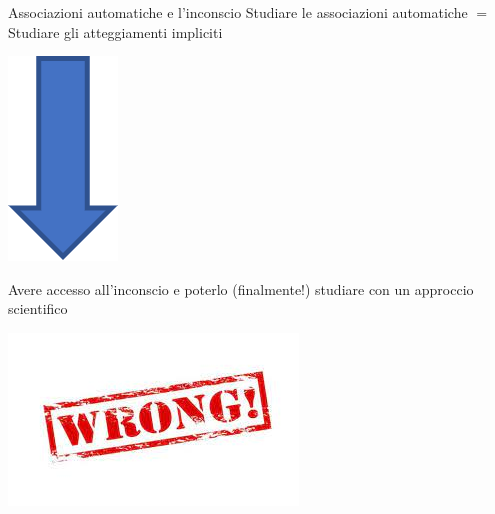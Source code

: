 \documentclass[compress]{beamer}
\begin{document}
\begin{frame}{Associazioni automatiche e l'inconscio}
	Studiare le associazioni automatiche  $=$ Studiare gli atteggiamenti impliciti
	
	\vspace{3.5mm}
	\begin{center}
		\includegraphics[width=.10\textheight]{down.png}
		
		\vspace{3.5mm}
		Avere accesso all'inconscio e poterlo (finalmente!) studiare con un approccio scientifico
	\end{center}

\pause

\centering
\includegraphics[width=.50\linewidth]{wrong.jpg}

\end{frame}
\end{document}
